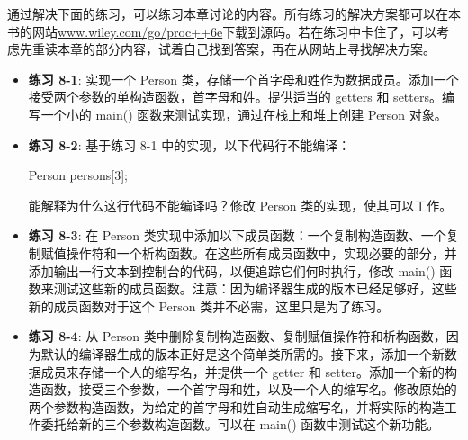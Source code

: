 通过解决下面的练习，可以练习本章讨论的内容。所有练习的解决方案都可以在本书的网站\url{www.wiley.com/go/proc++6e}下载到源码。若在练习中卡住了，可以考虑先重读本章的部分内容，试着自己找到答案，再在从网站上寻找解决方案。

\begin{itemize}
\item
\textbf{练习 8-1}: 实现一个 Person 类，存储一个首字母和姓作为数据成员。添加一个接受两个参数的单构造函数，首字母和姓。提供适当的 getters 和 setters。编写一个小的 main() 函数来测试实现，通过在栈上和堆上创建 Person 对象。

\item
\textbf{练习 8-2}: 基于练习 8-1 中的实现，以下代码行不能编译：

\begin{cpp}
Person persons[3];
\end{cpp}

能解释为什么这行代码不能编译吗？修改 Person 类的实现，使其可以工作。

\item
\textbf{练习 8-3}: 在 Person 类实现中添加以下成员函数：一个复制构造函数、一个复制赋值操作符和一个析构函数。在这些所有成员函数中，实现必要的部分，并添加输出一行文本到控制台的代码，以便追踪它们何时执行，修改 main() 函数来测试这些新的成员函数。注意：因为编译器生成的版本已经足够好，这些新的成员函数对于这个 Person 类并不必需，这里只是为了练习。

\item
\textbf{练习 8-4}: 从 Person 类中删除复制构造函数、复制赋值操作符和析构函数，因为默认的编译器生成的版本正好是这个简单类所需的。接下来，添加一个新数据成员来存储一个人的缩写名，并提供一个 getter 和 setter。添加一个新的构造函数，接受三个参数，一个首字母和姓，以及一个人的缩写名。修改原始的两个参数构造函数，为给定的首字母和姓自动生成缩写名，并将实际的构造工作委托给新的三个参数构造函数。可以在 main() 函数中测试这个新功能。
\end{itemize}